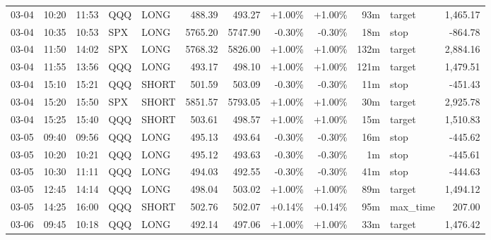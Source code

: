 \documentclass[11pt,a4paper,twoside]{article}
\begin{document}
\begin{center}
\begin{longtable}{>{\color{txtmain}}l l l l l r r r r r >{\color{txtmain}}l r}
03-04 & 10:20 & 11:53 & QQQ & LONG & 488.39 & 493.27 & \textcolor{wingreen}{+1.00\%} & \textcolor{wingreen}{+1.00\%} & 93m & target & \textcolor{wingreen}{1,465.17} \\
03-04 & 10:35 & 10:53 & SPX & LONG & 5765.20 & 5747.90 & \textcolor{lossred}{-0.30\%} & \textcolor{lossred}{-0.30\%} & 18m & stop & \textcolor{lossred}{-864.78} \\
03-04 & 11:50 & 14:02 & SPX & LONG & 5768.32 & 5826.00 & \textcolor{wingreen}{+1.00\%} & \textcolor{wingreen}{+1.00\%} & 132m & target & \textcolor{wingreen}{2,884.16} \\
03-04 & 11:55 & 13:56 & QQQ & LONG & 493.17 & 498.10 & \textcolor{wingreen}{+1.00\%} & \textcolor{wingreen}{+1.00\%} & 121m & target & \textcolor{wingreen}{1,479.51} \\
03-04 & 15:10 & 15:21 & QQQ & SHORT & 501.59 & 503.09 & \textcolor{lossred}{-0.30\%} & \textcolor{lossred}{-0.30\%} & 11m & stop & \textcolor{lossred}{-451.43} \\
03-04 & 15:20 & 15:50 & SPX & SHORT & 5851.57 & 5793.05 & \textcolor{wingreen}{+1.00\%} & \textcolor{wingreen}{+1.00\%} & 30m & target & \textcolor{wingreen}{2,925.78} \\
03-04 & 15:25 & 15:40 & QQQ & SHORT & 503.61 & 498.57 & \textcolor{wingreen}{+1.00\%} & \textcolor{wingreen}{+1.00\%} & 15m & target & \textcolor{wingreen}{1,510.83} \\
03-05 & 09:40 & 09:56 & QQQ & LONG & 495.13 & 493.64 & \textcolor{lossred}{-0.30\%} & \textcolor{lossred}{-0.30\%} & 16m & stop & \textcolor{lossred}{-445.62} \\
03-05 & 10:20 & 10:21 & QQQ & LONG & 495.12 & 493.63 & \textcolor{lossred}{-0.30\%} & \textcolor{lossred}{-0.30\%} & 1m & stop & \textcolor{lossred}{-445.61} \\
03-05 & 10:30 & 11:11 & QQQ & LONG & 494.03 & 492.55 & \textcolor{lossred}{-0.30\%} & \textcolor{lossred}{-0.30\%} & 41m & stop & \textcolor{lossred}{-444.63} \\
03-05 & 12:45 & 14:14 & QQQ & LONG & 498.04 & 503.02 & \textcolor{wingreen}{+1.00\%} & \textcolor{wingreen}{+1.00\%} & 89m & target & \textcolor{wingreen}{1,494.12} \\
03-05 & 14:25 & 16:00 & QQQ & SHORT & 502.76 & 502.07 & \textcolor{wingreen}{+0.14\%} & \textcolor{wingreen}{+0.14\%} & 95m & max\_time & \textcolor{wingreen}{207.00} \\
03-06 & 09:45 & 10:18 & QQQ & LONG & 492.14 & 497.06 & \textcolor{wingreen}{+1.00\%} & \textcolor{wingreen}{+1.00\%} & 33m & target & \textcolor{wingreen}{1,476.42} \\

\end{longtable}
\end{center}
\end{document}
